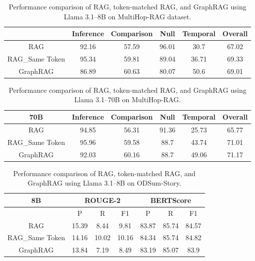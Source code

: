 \begin{table}[!htb]
\centering
\caption{Performance comparison of RAG, token-matched RAG, and GraphRAG using Llama 3.1–8B on MultiHop-RAG dataset.}
\label{app:tab:token1}
\begin{tabular}{c|ccccc}
\hline
        & Inference & Comparison & Null  & Temporal & Overall \\ \hline
RAG       & 92.16     & 57.59       & 96.01 & 30.7     & 67.02   \\
RAG\_Same Token & 95.34     & 59.81       & 89.04 & 36.71    & 69.33   \\
GraphRAG  & 86.89     & 60.63       & 80.07 & 50.6     & 69.01   \\ \hline
\end{tabular}
\end{table}

\begin{table}[!htb]
\centering
\caption{Performance comparison of RAG, token-matched RAG, and GraphRAG using Llama 3.1–70B on MultiHop-RAG.}
\label{app:tab:token2}
\begin{tabular}{c|ccccc}
\hline
70B       & Inference & Comparison & Null  & Temporal & Overall \\ \hline
RAG       & 94.85     & 56.31       & 91.36 & 25.73    & 65.77   \\
RAG\_Same Token & 95.96     & 59.58       & 88.7  & 43.74    & 71.01   \\
GraphRAG  & 92.03     & 60.16       & 88.7  & 49.06    & 71.17   \\ \hline
\end{tabular}
\end{table}

\begin{table}[!htb]
\centering
\caption{Performance comparison of RAG, token-matched RAG, and GraphRAG using Llama 3.1–8B on ODSum-Story.}
\label{app:tab:token3}
\begin{tabular}{c|ccc|ccc}
\hline
8B                    & \multicolumn{3}{c|}{ROUGE-2} & \multicolumn{3}{c}{BERTScore} \\ \hline
\multicolumn{1}{l|}{} & P        & R       & F1      & P        & R        & F1      \\ \hline
RAG                   & 15.39    & 8.44    & 9.81    & 83.87    & 85.74    & 84.57   \\
RAG\_Same Token             & 14.16    & 10.02   & 10.16   & 84.34    & 85.74    & 84.82   \\
GraphRAG              & 13.84    & 7.19    & 8.49    & 83.19    & 85.07    & 83.9    \\ \hline
\end{tabular}
\end{table}

